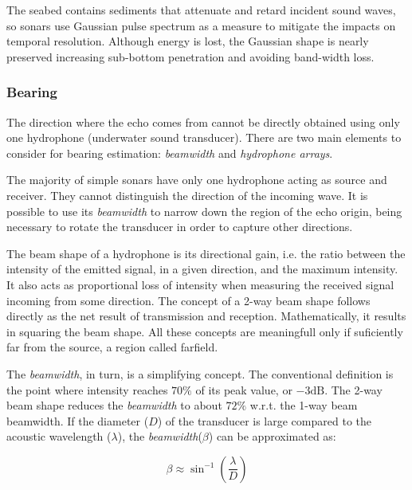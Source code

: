 The seabed contains sediments that attenuate and retard incident sound waves, so
sonars use Gaussian pulse spectrum as a measure to mitigate the impacts on temporal
resolution. Although energy is lost, the Gaussian shape is nearly preserved
increasing sub-bottom penetration and avoiding band-width loss.

\subsubsection{Bearing}
\label{sss:bearing}

The direction where the echo comes from cannot be directly obtained using
only one hydrophone (underwater sound transducer). There are two main elements
to consider for bearing estimation: \textit{beamwidth} and \textit{hydrophone
arrays}.

The majority of simple sonars have only one hydrophone acting as source and
receiver. They cannot distinguish the direction of the incoming wave. It is
possible to use its \textit{beamwidth} to narrow down the region of the echo
origin, being necessary to rotate the transducer in order to capture
other directions.

The beam shape of a hydrophone is its directional gain, i.e. the ratio between
the intensity of the emitted signal, in a given direction, and the maximum
intensity. It also acts as proportional loss of intensity when measuring the
received signal incoming from some direction. The concept of a 2-way beam
shape follows directly as the net result of transmission and reception.
Mathematically, it results in squaring the beam shape. All these concepts are
meaningfull only if suficiently far from the source, a region called
farfield\cite{beamwidth}.

The \textit{beamwidth}, in turn, is a simplifying concept. The conventional
definition is the point where intensity reaches $70\%$ of its peak value,
or $-3\text{dB}$. The 2-way beam shape reduces the \textit{beamwidth} to about
$72\%$ w.r.t. the 1-way beam beamwidth. If the diameter ($D$) of the transducer
is large compared to the acoustic wavelength ($\lambda$), the
\textit{beamwidth}($\beta$) can be approximated as:

\[ \beta \approx \sin^{-1}\left(\frac{\lambda}{D} \right) \]

